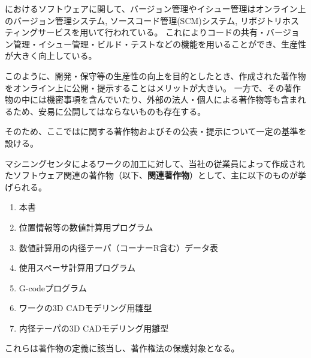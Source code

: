 

\DMC におけるソフトウェアに関して、バージョン管理やイシュー管理はオンライン上のバージョン管理システム, ソースコード管理(SCM)システム, リポジトリホスティングサービスを用いて行われている。
これによりコードの共有・バージョン管理・イシュー管理・ビルド・テストなどの機能を用いることができ、生産性が大きく向上している。

このように、開発・保守等の生産性の向上を目的としたとき、作成された著作物をオンライン上に公開・提示することはメリットが大きい。
一方で、その著作物の中には機密事項を含んでいたり、外部の法人・個人による著作物等も含まれるため、安易に公開してはならないものも存在する。

そのため、ここでは\DMC に関する著作物およびその公表・提示について一定の基準を設ける。



マシニングセンタによるワークの加工に対して、当社の従業員によって作成されたソフトウェア関連の著作物（以下、\textbf{関連著作物}）として、主に以下のものが挙げられる。
\begin{enumerate}[label=\sarrow]
\item 本書
\item 位置情報等の数値計算用プログラム
\item {}数値計算用の内径テーパ（コーナーR含む）データ表
\item {}使用スペーサ計算用プログラム
\item {}G-codeプログラム
\item {}ワークの3D CADモデリング用雛型
\item {}内径テーパの3D CADモデリング用雛型
\end{enumerate}
これらは著作物の定義に該当し、著作権法の保護対象となる。




